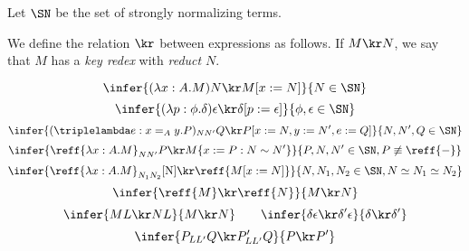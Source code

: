 
Let $\SN$ be the set of strongly normalizing terms.

We define the relation $\kr$ between expressions as follows.  If $M \kr N$, we say that $M$ has a \emph{key redex} with \emph{reduct} $N$.

\[ \infer{(\lambda x:A.M)N \kr M[x:= N]}{N \in \SN} \]
\[ \infer{(\lambda p:\phi.\delta)\epsilon \kr \delta[p:= \epsilon]}{\phi, \epsilon \in \SN} \]
\[ \infer{(\triplelambda e:x =_A y.P)_{N N'} Q \kr P[x:= N, y:= N', e:= Q]}{N, N', Q \in \SN} \]
\[ \infer{\reff{\lambda x:A.M}_{N N'} P \kr M\{ x:= P : N \sim N' \}}{P, N, N' \in \SN, P \not\equiv \reff{-}} \]
\[ \infer{\reff{\lambda x:A.M}_{N_1 N_2} \ref{N} \kr \reff{M[x:=N]}}{N, N_1, N_2 \in \SN, N \simeq N_1 \simeq N_2} \]
\[ \infer{\reff{M} \kr \reff{N}}{M \kr N} \]
\[ \infer{ML \kr NL}{M \kr N} \qquad \infer{\delta \epsilon \kr \delta' \epsilon}{\delta \kr \delta'} \]
\[ \infer{P_{L L'} Q \kr P'_{L L'} Q}{P \kr P'} \]

